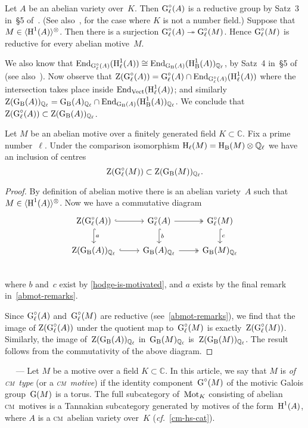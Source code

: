 \documentclass[10pt,twoside,leqno]{article}
\renewcommand{\paragraph}[1]{\par\bigskip\refstepcounter{subsection}%
 {\normalfont\normalsize\scshape\noindent\thesubsection%
 \ifthenelse{\equal{#1}{}}%
 {}%
 {\ \textls{#1.}}%
 \ ---}%
}
\numberwithin{equation}{subsection}
\newcommand{\onto}{\twoheadrightarrow}
\newcommand{\End}{\textnormal{End}}
\newcommand{\QQ}{\mathbb{Q}}
\newcommand{\QQl}{\QQ_{\ell}}
\newcommand{\CC}{\mathbb{C}}
\newcommand{\Vect}{\textnormal{Vect}}
\newcommand{\HH}{\textnormal{H}}
\newcommand{\Hl}{\HH_{\ell}}
\newcommand{\HB}{\HH_{\textnormal{B}}}
\newcommand{\Mot}{\textnormal{Mot}}
\newcommand{\Zentrum}{\textnormal{Z}}
\newcommand{\GG}{\textnormal{G}}
\newcommand{\GB}{\GG_{\textnormal{B}}}
\newcommand{\Gl}{\GG_{\ell}}
\newcommand{\Glc}{\Gl^{\circ}}
\newcommand{\Tangen}[1]{\langle #1 \rangle^{\otimes}}
\newcommand{\cm}{\textsc{cm}}
\begin{document}
Let $A$ be an abelian variety over~$K$.
Then $\Glc(A)$ is a reductive group
by Satz~3 in~\S5 of~\cite{Fal83}.
(See also~\cite{Fal84}, for the case where $K$ is not a number field.)
Suppose that $M \in \Tangen{\HH^1(A)}$.
Then there is a surjection $\Glc(A) \onto \Glc(M)$.
Hence $\Glc(M)$ is reductive for every abelian motive~$M$.

We also know that
$\End_{\Glc(A)}(\Hl^1(A)) \cong \End_{\GB(A)}(\HB^1(A))_{\QQl}$,
by Satz~4 in~\S5 of~\cite{Fal83} (see also~\cite{Fal84}).
Now observe that $\Zentrum(\Glc(A)) = \Glc(A) \cap \End_{\Glc(A)}(\Hl^1(A))$
where the intersection takes place inside $\End_{\Vect}(\Hl^1(A))$;
and similarly $\Zentrum(\GB(A))_{\QQl} =
\GB(A)_{\QQl} \cap \End_{\GB(A)}(\HB^1(A))_{\QQl}$.
We conclude that $\Zentrum(\Glc(A)) \subset \Zentrum(\GB(A))_{\QQl}$.

\begin{lemma} %
 \label{abelian-motive-centre-inclusion}
 Let $M$ be an abelian motive over
 a finitely generated field $K \subset \CC$.
 Fix a prime number~$\ell$.
 Under the comparison isomorphism $\Hl(M) = \HB(M) \otimes \QQl$
 we have an inclusion of centres
 \[
  \Zentrum(\Glc(M)) \subset \Zentrum(\GB(M))_{\QQl}.
 \]
 \begin{proof}
  By definition of abelian motive there is an abelian variety~$A$
  such that $M \in \Tangen{\HH^1(A)}$.
  Now we have a commutative diagram
  \[
   \begin{tikzcd}
    \Zentrum(\Glc(A)) \ar[r,hook] \ar[d,hook,"a"] &
    \Glc(A) \ar[r,two heads] \ar[d,hook,"b"] &
    \Glc(M) \ar[d,hook,"c"] \\
    \Zentrum(\GB(A))_{\QQl} \ar[r,hook] &
    \GB(A)_{\QQl} \ar[r,two heads] &
    \GB(M)_{\QQl} \\
   \end{tikzcd}
  \]
  where $b$ and~$c$ exist by \cref{hodge-is-motivated},
  and $a$ exists by the final remark in~\cref{abmot-remarks}.

  Since $\Glc(A)$ and~$\Glc(M)$ are reductive (see~\cref{abmot-remarks}),
  we find that the image of $\Zentrum(\Glc(A))$
  under the quotient map to~$\Glc(M)$
  is exactly~$\Zentrum(\Glc(M))$.
  Similarly,
  the image of~$\Zentrum(\GB(A))_{\QQl}$ in~$\GB(M)_{\QQl}$
  is~$\Zentrum(\GB(M))_{\QQl}$.
  The result follows from the commutativity of the above diagram.
 \end{proof}
\end{lemma}

\paragraph{} %
Let $M$ be a motive over a field $K \subset \CC$.
In this article,
we say that $M$ is \emph{of \cm~type} (or a \emph{\cm~motive})
if the identity component~$\GG^\circ(M)$
of the motivic Galois group~$\GG(M)$ is a torus.
The full subcategory of~$\Mot_K$ consisting of abelian \cm~motives
is a Tannakian subcategory generated by motives of the form~$\HH^1(A)$,
where $A$ is a \cm~abelian variety over~$K$ (\emph{cf.}~\cref{cm-hs-cat}).
\end{document}
